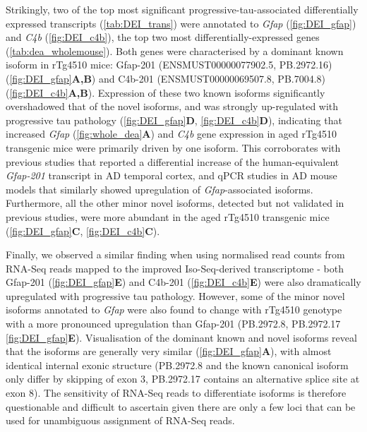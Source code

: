 Strikingly, two of the top most significant progressive-tau-associated differentially expressed transcripts (\cref{tab:DEI_trans}) were annotated to \textit{Gfap} (\cref{fig:DEI_gfap}) and \textit{C4b} (\cref{fig:DEI_c4b}), the top two most differentially-expressed genes (\cref{tab:dea_wholemouse}). Both genes were characterised by a dominant known isoform in rTg4510 mice: Gfap-201 (ENSMUST00000077902.5, PB.2972.16) (\cref{fig:DEI_gfap}\textbf{A,B}) and C4b-201 (ENSMUST00000069507.8, PB.7004.8) (\cref{fig:DEI_c4b}\textbf{A,B}). Expression of these two known isoforms significantly overshadowed that of the novel isoforms, and was strongly up-regulated with progressive tau pathology (\cref{fig:DEI_gfap}\textbf{D}, \cref{fig:DEI_c4b}\textbf{D}), indicating that increased \textit{Gfap} (\cref{fig:whole_dea}\textbf{A}) and \textit{C4b} gene expression in aged rTg4510 transgenic mice were primarily driven by one isoform. This corroborates with previous studies that reported a differential increase of the human-equivalent \textit{Gfap-201} transcript in AD temporal cortex\cite{Roelofs2005}, and qPCR studies in AD mouse models that similarly showed upregulation of \textit{Gfap}-associated isoforms\cite{Kamphuis2012}. Furthermore, all the other minor novel isoforms, detected but not validated in previous studies\cite{Kamphuis2012}, were more abundant in the aged rTg4510 transgenic mice (\cref{fig:DEI_gfap}\textbf{C}, \cref{fig:DEI_c4b}\textbf{C}).

Finally, we observed a similar finding when using normalised read counts from RNA-Seq reads mapped to the improved Iso-Seq-derived transcriptome - both Gfap-201 (\cref{fig:DEI_gfap}\textbf{E}) and C4b-201 (\cref{fig:DEI_c4b}\textbf{E})  were also dramatically upregulated with progressive tau pathology. However, some of the minor novel isoforms annotated to \textit{Gfap} were also found to change with rTg4510 genotype with a more pronounced upregulation than Gfap-201 (PB.2972.8, PB.2972.17 \cref{fig:DEI_gfap}\textbf{E}). Visualisation of the dominant known and novel isoforms reveal that the isoforms are generally very similar (\cref{fig:DEI_gfap}\textbf{A}), with almost identical internal exonic structure (PB.2972.8 and the known canonical isoform only differ by skipping of exon 3, PB.2972.17 contains an alternative splice site at exon 8). The sensitivity of RNA-Seq reads to differentiate isoforms is therefore questionable and difficult to ascertain given there are only a few loci that can be used for unambiguous assignment of RNA-Seq reads.  

